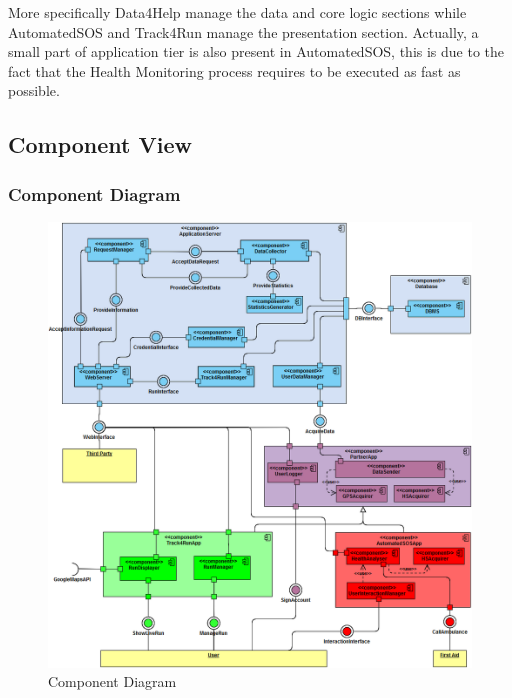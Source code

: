 More specifically Data4Help manage the data and core logic sections while AutomatedSOS and Track4Run manage the presentation section. Actually, a small part of application tier is also present in AutomatedSOS, this is due to the fact that the Health Monitoring process requires to be executed as fast as possible.

\clearpage
\subsection{Component View}

\subsubsection{Component Diagram}
\begin{figure}[H]
\centering
\includegraphics[scale=0.44]{Images/ComponentDiagram.png}
\caption{Component Diagram}
\end{figure}

